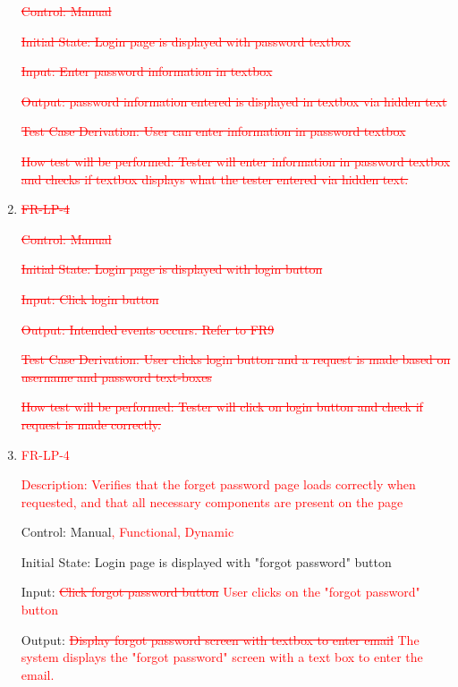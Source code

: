 \documentclass[12pt, titlepage]{article}
\begin{document}
\begin{enumerate}
	\textcolor{red}{\sout{Control: Manual}}

\textcolor{red}{\sout{Initial State: Login page is displayed with password textbox}}

\textcolor{red}{\sout{Input: Enter password information in textbox}}

\textcolor{red}{\sout{Output: password information entered is displayed in textbox via hidden text}}

\textcolor{red}{\sout{Test Case Derivation: User can enter information in password textbox}}

\textcolor{red}{\sout{How test will be performed: Tester will enter information in password textbox and checks if textbox displays what the tester entered via hidden text.}}

\item{\textcolor{red}{\sout{FR-LP-4}}\\}

\textcolor{red}{\sout{Control: Manual}}

\textcolor{red}{\sout{Initial State: Login page is displayed with login button}}

\textcolor{red}{\sout{Input: Click login button}}

\textcolor{red}{\sout{Output: Intended events occurs. Refer to FR9}}

\textcolor{red}{\sout{Test Case Derivation: User clicks login button and a request is made based on username and password text-boxes}}

\textcolor{red}{\sout{How test will be performed: Tester will click on login button and check if request is made correctly.}}
	
    \item{\textcolor{red}{FR-LP-4}\\}

        \textcolor{red}{Description: Verifies that the forget password page loads correctly when requested, and that all necessary components are present on the page}
	
	Control: Manual\textcolor{red}{, Functional, Dynamic}
	
	Initial State: Login page is displayed with "forgot password" button
	
	Input: \textcolor{red}{\sout{Click forgot password button}} \textcolor{red}{User clicks on the "forgot password" button}
	
	Output: \textcolor{red}{\sout{Display forgot password screen with textbox to enter email}} \textcolor{red}{The system displays the "forgot password" screen with a text box to enter the email.}
	

\end{enumerate}
\end{document}
